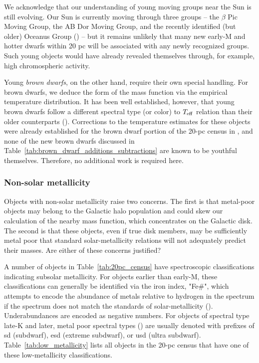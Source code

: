 \documentclass[twocolumn,tighten,twocolappendix]{aastex631}
\begin{document}
We acknowledge that our understanding of  young moving groups near the Sun is still evolving. Our Sun is currently moving through three groups -- the $\beta$ Pic Moving Group, the AB Dor Moving Group, and the recently identified (but older) Oceanus Group (\citealt{gagne2023}) -- but it remains unlikely that many new early-M and hotter dwarfs within 20 pc will be associated with any newly recognized groups. Such young objects would have already revealed themselves through, for example, high chromospheric activity.

Young {\it brown dwarfs}, on the other hand, require their own special handling. For brown dwarfs, we deduce the form of the mass function via the empirical temperature distribution. It has been well established, however, that young brown dwarfs follow a different spectral type (or color) to $T_{\rm eff}$ relation than their older counterparts (\citealt{faherty2016}). Corrections to the temperature estimates for these objects were already established for the brown dwarf portion of the 20-pc census in \cite{kirkpatrick2021}, and none of the new brown dwarfs discussed in Table~\ref{tab:brown_dwarf_additions_subtractions} are known to be youthful themselves. Therefore, no additional work is required here.

\subsubsection{Non-solar metallicity\label{sec:subdwarfs}}

Objects with non-solar metallicity raise two concerns. The first is that metal-poor objects may belong to the Galactic halo population and could skew our calculation of the nearby mass function, which concentrates on the Galactic disk. The second is that these objects, even if true disk members, may be sufficiently metal poor that standard solar-metallicity relations will not adequately predict their masses. Are either of these concerns justified?

A number of objects in Table~\ref{tab:20pc_census} have spectroscopic classifications indicating subsolar metallicity. For objects earlier than early-M, these classifications can generally be identified via the iron index, "Fe\#", which attempts to encode the abundance of metals relative to hydrogen in the spectrum if the spectrum does not match the standards of solar-metallicity (\citealt{gray2009}). Underabundances are encoded as negative numbers. For objects of spectral type late-K and later, metal poor spectral types (\citealt{gizis1997,lepine2003,kirkpatrick2005,lepine2007,burgasser2007c,zhang2017}) are usually denoted with prefixes of sd (subdwarf), esd (extreme subdwarf), or usd (ultra subdwarf). Table~\ref{tab:low_metallicity} lists all objects in the 20-pc census that have one of these low-metallicity classifications. 
\end{document}

